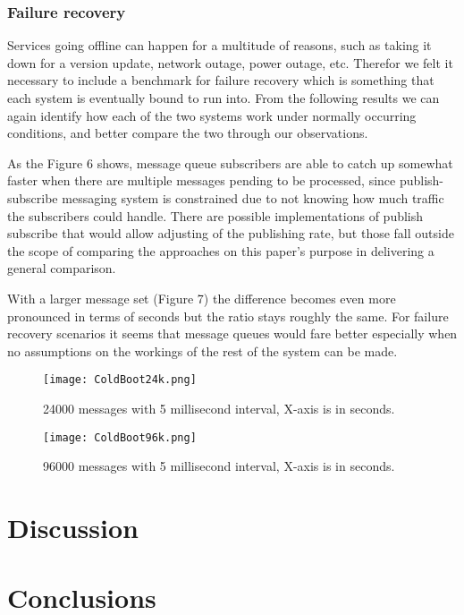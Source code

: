 \documentclass[conference]{IEEEtran}
\begin{document}
\subsubsection{Failure recovery}
Services going offline can happen for a multitude of reasons, such as taking it down for a version update, network outage, power outage, etc. Therefor we felt it necessary to include a benchmark for failure recovery which is something that each system is eventually bound to run into. From the following results we can again identify how each of the two systems work under normally occurring conditions, and better compare the two through our observations.

As the Figure 6 shows, message queue subscribers are able to catch up somewhat faster when there are multiple messages pending to be processed, since publish-subscribe messaging system is constrained due to not knowing how much traffic the subscribers could handle. There are possible implementations of publish subscribe that would allow adjusting of the publishing rate, but those fall outside the scope of comparing the approaches on this paper's purpose in delivering a general comparison.

With a larger message set (Figure 7) the difference becomes even more pronounced in terms of seconds but the ratio stays roughly the same. For failure recovery scenarios it seems that message queues would fare better especially when no assumptions on the workings of the rest of the system can be made.

\begin{figure}
    \centering
    \texttt{[image: ColdBoot24k.png]}
    \caption{24000 messages with 5 millisecond interval, X-axis is in seconds.}
\end{figure}

\begin{figure}
    \centering
    \texttt{[image: ColdBoot96k.png]}
    \caption{96000 messages with 5 millisecond interval, X-axis is in seconds.}
\end{figure}

\section{Discussion}

\section{Conclusions}
\end{document}
